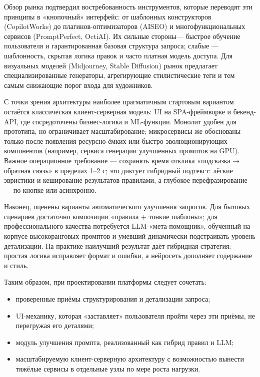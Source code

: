 Обзор рынка подтвердил востребованность инструментов, которые переводят эти принципы в «кнопочный» интерфейс: от шаблонных конструкторов (CopilotWorks) до плагинов-оптимизаторов (AISEO) и многофункциональных сервисов (PromptPerfect, OctiAI). Их сильные стороны— быстрое обучение пользователя и гарантированная базовая структура запроса; слабые — шаблонность, скрытая логика правок и часто платная модель доступа. Для визуальных моделей (Midjourney, Stable Diffusion) рынок предлагает специализированные генераторы, агрегирующие стилистические теги и тем самым снижающие порог входа для художников.

С точки зрения архитектуры наиболее прагматичным стартовым вариантом остаётся классическая клиент-серверная модель: UI на SPA-фреймворке и бекенд-API, где сосредоточены бизнес-логика и ML-функции. Монолит удобен для прототипа, но ограничивает масштабирование; микросервисы же обоснованы только после появления ресурсно-ёмких или быстро эволюционирующих компонентов (например, сервиса генерации улучшенных промптов на GPU). Важное операционное требование — сохранять время отклика «подсказка → обратная связь» в пределах 1–2 с; это диктует гибридный подтекст: лёгкие эвристики и кеширование результатов правилами, а глубокое перефразирование — по кнопке или асинхронно.

Наконец, оценены варианты автоматического улучшения запросов. Для бытовых сценариев достаточно композиции «правила + тонкие шаблоны»; для профессионального качества потребуется LLM-«мета-помощник», обученный на корпусе высокоранговых промптов и умевший динамически подстраивать уровень детализации. На практике наилучший результат даёт гибридная стратегия: простая логика исправляет формат и ошибки, а нейросеть дополняет содержание и стиль.

Таким образом, при проектировании платформы следует сочетать:
\begin{itemize}
\item проверенные приёмы структурирования и детализации запроса;
\item UI-механику, которая «заставляет» пользователя пройти через эти приёмы, не перегружая его деталями;
\item модуль улучшения промпта, реализованный как гибрид правил и LLM;
\item масштабируемую клиент-серверную архитектуру с возможностью вынести тяжёлые сервисы в отдельные узлы по мере роста нагрузки.
\end{itemize}